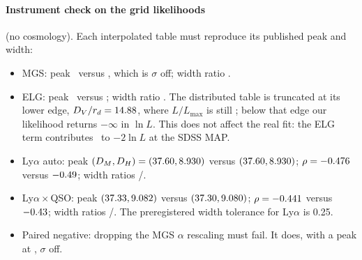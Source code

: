 \documentclass[11pt]{article}
\begin{document}
\paragraph{Instrument check on the grid likelihoods} (no cosmology). Each
interpolated table must reproduce its published peak and width:
\begin{itemize}
\item MGS: peak \IcMgsPeak\ versus \IcMgsRef, which is
  \IcMgsDev$\sigma$ off; width ratio \IcMgsW.
\item ELG: peak \IcElgPeak\ versus \IcElgRef; width ratio \IcElgW. The
  distributed table is truncated at its lower edge, $D_V/r_d=14.88$,
  where $L/L_\mathrm{max}$ is still \IcElgLowL; below that edge our
  likelihood returns $-\infty$ in $\ln L$. This does not affect the real fit:
  the ELG term contributes \FitElgMtwo\ to $-2\ln L$ at the SDSS MAP.
\item Ly$\alpha$ auto: peak $(D_M,D_H)=(37.60,8.930)$ versus
  $(37.60,8.930)$; $\rho=-0.476$ versus $-0.49$; width
  ratios \IcLaWDM/\IcLaWDH.
\item Ly$\alpha\times$QSO: peak $(37.33,9.082)$ versus
  $(37.30,9.080)$; $\rho=-0.441$ versus $-0.43$; width
  ratios \IcLxWDM/\IcLxWDH. The preregistered width tolerance for
  Ly$\alpha$ is 0.25.
\item Paired negative: dropping the MGS $\alpha$ rescaling must fail. It
  does, with a peak at \IcMgsNegPeak, \IcMgsNegDev$\sigma$ off.
\end{itemize}
\end{document}
